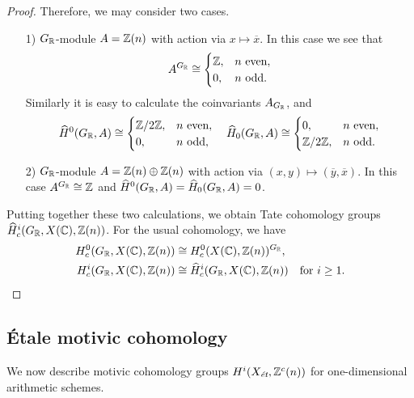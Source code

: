 \documentclass{article}
\numberwithin{equation}{section}
\begin{document}
\begin{proposition}
\begin{proof}
    Therefore, we may consider two cases.
    \begin{enumerate}
    \item[1)] $G_\RR$-module $A = \ZZ (n)$ with action via
      $x \mapsto \overline{x}$.  In this case we see that
      \[ A^{G_\RR} \cong
        \begin{cases}
          \ZZ, & n\text{ even}, \\
          0, & n\text{ odd}.
        \end{cases} \]
      Similarly it is easy to calculate the coinvariants $A_{G_\RR}$, and
      \[ \widehat{H}^0 (G_\RR, A) \cong
        \begin{cases}
          \ZZ/2\ZZ, & n\text{ even},\\
          0, & n\text{ odd},
        \end{cases} \quad
        \widehat{H}_0 (G_\RR, A) \cong
        \begin{cases}
          0, & n\text{ even},\\
          \ZZ/2\ZZ, & n\text{ odd}.
        \end{cases} \]

    \item[2)] $G_\RR$-module $A = \ZZ (n) \oplus \ZZ (n)$ with action via
      $(x,y) \mapsto (\overline{y}, \overline{x})$. In this case
      $A^{G_\RR} \cong \ZZ$ and
      $\widehat{H}^0 (G_\RR,A) = \widehat{H}_0 (G_\RR,A) = 0$.
    \end{enumerate}

    Putting together these two calculations, we obtain Tate cohomology groups
    $\widehat{H}^i_c (G_\RR, X(\CC), \ZZ (n))$. For the usual cohomology, we
    have
    \begin{align*}
      H^0_c (G_\RR, X(\CC), \ZZ (n)) & \cong H^0_c (X(\CC), \ZZ (n))^{G_\RR}, \\
      H^i_c (G_\RR, X(\CC), \ZZ (n)) & \cong \widehat{H}^i_c (G_\RR, X(\CC), \ZZ (n)) \quad \text{for }i \ge 1. \qedhere
    \end{align*}
  \end{proof}
\end{proposition}

\subsection*{Étale motivic cohomology}

We now describe motivic cohomology groups $H^i (X_\et, \ZZ^c (n))$ for
one-dimensional arithmetic schemes.
\end{document}
